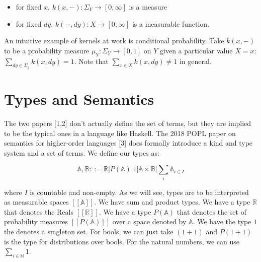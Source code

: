 \documentclass[11pt]{article}
\theoremstyle{definition}
\theoremstyle{plain}
\renewcommand{\b}[1]{\mathbb{#1}}
\begin{document}
\begin{itemize}
    \item for fixed $x$, $k(x,-): \Sigma_Y \rightarrow [0,\infty]$ is a measure
    \item for fixed $dy$, $k(-,dy): X \rightarrow [0,\infty]$ is a measurable function.
\end{itemize}

\noindent An intuitive example of kernels at work is conditional probability.
Take $k(x,-)$ to be a probability measure $\mu_Y: \Sigma_Y \rightarrow [0,1]$ on $Y$ given a particular value $X=x$:
$\sum_{dy \in \Sigma_y} k(x,dy) = 1$. Note that $\sum_{x \in X} k(x,dy) \neq 1$ in general.\\





\section{Types and Semantics}

\noindent The two papers [1,2] don't actually define the set of terms,
but they are implied to be the typical ones in a language like Haskell.
The 2018 POPL paper on semantics for higher-order languages [3] does formally
introduce a kind and type system and a set of terms. We define our types as:

$$ \b{A},\b{B} ::= 
    \b{R} | P(\b{A}) | 1 | \b{A} \times \b{B} | \sum_i \b{A}_{i \in I} $$

\noindent where $I$ is countable and non-empty. As we will see, 
types are to be interpreted as measurable spaces $[[\b{A}]]$. 
We have sum and product types. We have a type $\b{R}$ that denotes the Reals $[[\b{R}]]$. 
We have a type $P(\b{A})$ that denotes the set of probability measures $[[P(\b{A})]]$
over a space denoted by $\b{A}$. We have the type $1$ the denotes a singleton set. 
For bools, we can just take $(1+1)$ and $P(1+1)$ is the type for distributions over bools.
For the natural numbers, we can use $\sum_{i \in \b{N}} 1$. \\
\end{document}
